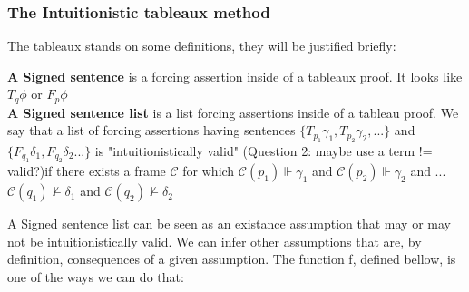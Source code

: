 \documentclass[runningheads]{llncs}
\begin{document}
\subsubsection{The Intuitionistic tableaux method }
The tableaux stands on some definitions, they will be justified briefly:
\begin{definition}
    \textbf{A Signed sentence} is a forcing assertion inside of a tableaux proof. It looks like $T_{q} \phi $ or $F_{p} \phi $ \\
    \textbf{A Signed sentence list} is a list forcing assertions inside of a tableau proof. We say that a list of forcing assertions having sentences $\{ T_{p_1}\gamma_{1}, T_{p_2}\gamma_{2}, ...\}$
  and $ \{F_{q_1}\delta_{1}, F_{q_2}\delta_{2}...\} $
     is "intuitionistically valid" (Question 2: maybe use a term != valid?)if there exists a frame $\mathcal{C}$ for which $ \mathcal{C}(p_1) \Vdash \gamma_{1}$ and $ \mathcal{C}(p_{2}) \Vdash \gamma_{2}$ and ... $ \mathcal{C}(q_{1}) \nvDash \delta_{1}$  and $ \mathcal{C}(q_{2}) \nvDash \delta_{2}$
\end{definition}
 

A Signed sentence list can be seen as an existance assumption that may or may not be intuitionistically valid. We can infer other assumptions that are, by definition, 
consequences of a given assumption. The function f, defined bellow, is one of the ways we can do that: 
\end{document}
